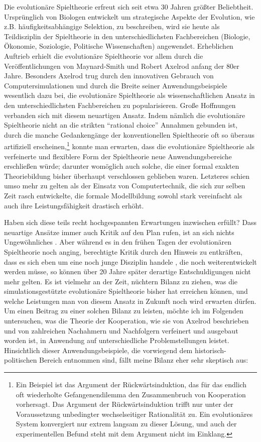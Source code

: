 \documentclass[12pt,a4paper,ngerman]{article}
\begin{document}
Die evolutionäre Spieltheorie erfreut sich seit etwa 30 Jahren größter
Beliebtheit. Ursprünglich von Biologen entwickelt um strategische
Aspekte der Evolution, wie z.B. häufigkeitsabhängige Selektion, zu
beschreiben, wird sie heute als Teildisziplin der Spieltheorie in den
unterschiedlichsten Fachbereichen (Biologie, Ökonomie, Soziologie,
Politische Wissenschaften) angewendet. Erheblichen Auftrieb erhielt
die evolutionäre Spieltheorie vor allem durch die Veröffentlichungen
von Maynard-Smith und Robert Axelrod anfang der 80er Jahre. Besonders
Axelrod trug durch den innovativen Gebrauch von Computersimulationen
und durch die Breite seiner Anwendungsbeispiele wesentlich dazu bei,
die evolutionäre Spieltheorie als wissenschaftlichen Ansatz in den
unterschiedlichsten Fachbereichen zu popularisieren. Große Hoffnungen
verbanden sich mit diesem neuartigen Ansatz. Indem nämlich die
evolutionäre Spieltheorie nicht an die strikten "`rational choice"'
Annahmen gebunden ist, durch die manche Gedankengänge der
konventionellen Spieltheorie oft so überaus artifiziell
erscheinen,\footnote{Ein Beispiel ist das Argument der
  Rückwärtsinduktion, das für das endlich oft wiederholte
  Gefangenendilemma den Zusammenbruch von Kooperation vorhersagt. Das
  Argument der Rückwärtsinduktion trifft nur unter der Voraussetzung
  unbedingter wechselseitiger Rationalität zu. Ein evolutionäres
  System konvergiert nur extrem langsam zu dieser Lösung, und auch der
  experimentellen Befund steht mit dem Argument nicht im Einklang.}
konnte man erwarten, dass die evolutionäre Spieltheorie als
verfeinerte und flexiblere Form der Spieltheorie neue
Anwendungsbereiche erschließen würde; darunter womöglich auch solche,
die einer formal exakten Theoriebildung bisher überhaupt verschlossen
geblieben waren. Letzteres schien umso mehr zu gelten als der Einsatz
von Computertechnik, die sich zur selben Zeit rasch entwickelte, die
formale Modellbildung sowohl stark vereinfacht als auch ihre
Leistungsfähigkeit drastisch erhöht.

Haben sich diese teils recht hochgespannten Erwartungen inzwischen
erfüllt? Dass neuartige Ansätze immer auch Kritik auf den Plan rufen,
ist an sich nichts Ungewöhnliches \cite{alexander:2003}. Aber während
es in den frühen Tagen der evolutionären Spieltheorie noch anging,
berechtigte Kritik durch den Hinweis zu entkräften, dass es sich eben
um eine noch junge Disziplin handele \cite[S. 38]{schuessler:1997}, die
noch weiterentwickelt werden müsse, so können über 20 Jahre später
derartige Entschuldigungen nicht mehr gelten. Es ist vielmehr an der
Zeit, nüchtern Bilanz zu ziehen, was die simulationsgestützte
evolutionäre Spieltheorie bisher hat erreichen können, und welche
Leistungen man von diesem Ansatz in Zukunft noch wird erwarten
dürfen. Um einen Beitrag zu einer solchen Bilanz zu leisten, möchte
ich im Folgenden untersuchen, was die Theorie der Kooperation, wie sie
von Axelrod beschrieben und von zahlreichen Nachahmern und Nachfolgern
verfeinert und ausgebaut worden ist, in Anwendung auf unterschiedliche
Problemstellungen leistet. Hinsichtlich dieser Anwendungsbeispiele,
die vorwiegend dem historisch-politischen Bereich entnommen sind,
fällt meine Bilanz eher sehr skeptisch aus:
\end{document}
